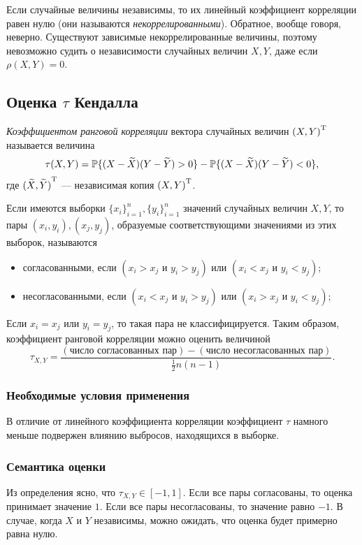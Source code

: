 Если случайные величины независимы, то их линейный коэффициент корреляции равен нулю (они называются \emph{некоррелированными}). Обратное, вообще говоря, неверно. Существуют зависимые некоррелированные величины, поэтому невозможно судить о независимости случайных величин $X, Y$, даже если $\rho(X, Y) = 0$.

\subsection*{Оценка $\tau$ Кендалла}

\begin{define}
\emph{Коэффициентом ранговой корреляции} вектора случайных величин $\trans{(X, Y)}$ называется величина
\begin{equation}
	\tau(X, Y) = \P\{(X - \widetilde{X})(Y - \widetilde{Y}) > 0\} - \P\{(X - \widetilde{X})(Y - \widetilde{Y}) < 0\},
\end{equation}
где $\trans{(\widetilde{X}, \widetilde{Y})}$ --- независимая копия $\trans{(X, Y)}$.
\end{define}

Если имеются выборки $\{x_i\}_{i=1}^n, \{y_i\}_{i=1}^n$ значений случайных величин $X, Y$, то пары $(x_i, y_i), (x_j, y_j)$, образуемые соответствующими значениями из этих выборок, называются
\begin{itemize}
	\item согласованными, если $(x_i > x_j \text{ и } y_i > y_j) \text{ или } (x_i < x_j \text{ и } y_i < y_j)$;
	\item несогласованными, если $(x_i < x_j \text{ и } y_i > y_j) \text{ или } (x_i > x_j \text{ и } y_i < y_j)$;
\end{itemize}
Если $x_i = x_j \text{ или } y_i = y_j$, то такая пара не классифицируется. Таким образом, коэффициент ранговой корреляции можно оценить величиной
\begin{equation}
\tau_{X, Y} = \frac{(\text{число согласованных пар}) - (\text{число несогласованных пар})}{\frac{1}{2}n(n - 1)}.
\end{equation}

\subsubsection*{Необходимые условия применения}
В отличие от линейного коэффициента корреляции коэффициент $\tau$ намного меньше подвержен влиянию выбросов, находящихся в выборке.
\subsubsection*{Семантика оценки}
Из определения ясно, что $\tau_{X, Y} \in [-1, 1]$. Если все пары согласованы, то оценка принимает значение $1$. Если все пары несогласованы, то значение равно $-1$. В случае, когда $X$ и $Y$ независимы, можно ожидать, что оценка будет примерно равна нулю.

